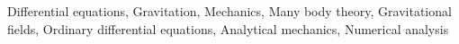 \documentclass[]{article}
\begin{document}
Differential equations, Gravitation, Mechanics, Many body theory, Gravitational fields, Ordinary differential equations, Analytical mechanics, Numerical analysis
\end{document}

